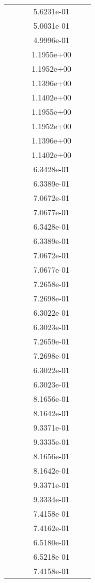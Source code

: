 \begin{xltabular}{\textwidth}{r|rS[table-format=1.3e+2]S[table-format=1.4e+2]S[table-format=1.4e+2]S[table-format=-1.5]}
&  &  & 5.6231e-01 & & \\
&  &  & 5.0031e-01 & & \\
&  &  & 4.9996e-01 & & \\
&  &  & 1.1955e+00 & & \\
&  &  & 1.1952e+00 & & \\
&  &  & 1.1396e+00 & & \\
&  &  & 1.1402e+00 & & \\
&  &  & 1.1955e+00 & & \\
&  &  & 1.1952e+00 & & \\
&  &  & 1.1396e+00 & & \\
&  &  & 1.1402e+00 & & \\
&  &  & 6.3428e-01 & & \\
&  &  & 6.3389e-01 & & \\
&  &  & 7.0672e-01 & & \\
&  &  & 7.0677e-01 & & \\
&  &  & 6.3428e-01 & & \\
&  &  & 6.3389e-01 & & \\
&  &  & 7.0672e-01 & & \\
&  &  & 7.0677e-01 & & \\
&  &  & 7.2658e-01 & & \\
&  &  & 7.2698e-01 & & \\
&  &  & 6.3022e-01 & & \\
&  &  & 6.3023e-01 & & \\
&  &  & 7.2659e-01 & & \\
&  &  & 7.2698e-01 & & \\
&  &  & 6.3022e-01 & & \\
&  &  & 6.3023e-01 & & \\
&  &  & 8.1656e-01 & & \\
&  &  & 8.1642e-01 & & \\
&  &  & 9.3371e-01 & & \\
&  &  & 9.3335e-01 & & \\
&  &  & 8.1656e-01 & & \\
&  &  & 8.1642e-01 & & \\
&  &  & 9.3371e-01 & & \\
&  &  & 9.3334e-01 & & \\
&  &  & 7.4158e-01 & & \\
&  &  & 7.4162e-01 & & \\
&  &  & 6.5180e-01 & & \\
&  &  & 6.5218e-01 & & \\
&  &  & 7.4158e-01 & & \\

\end{xltabular}
